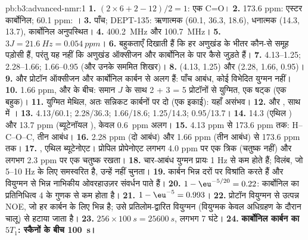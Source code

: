 \begin{solution}{pb:b3:advanced-nmr:1}
\textbf{1.} $(2 \times 6 + 2 - 12)/2 = 1$: एक C=O।
\textbf{2.} 173.6 ppm: एस्टर कार्बोनिल; 60.1 ppm: ।
\textbf{3.} पाँच; DEPT-135:  ऋणात्मक (60.1, 36.3, 18.6),  धनात्मक (14.3,
13.7), कार्बोनिल अनुपस्थित।
\textbf{4.} \qty{400.2}{MHz} और \qty{100.7}{MHz}।
\textbf{5.} $3J = \qty{21.6}{Hz} = \qty{0.054}{ppm}$।
\textbf{6.} बहुकताएँ दिखाती हैं कि हर अणुखंड के भीतर कौन-से समूह पड़ोसी हैं,
परंतु यह नहीं कि अणुखंड ऑक्सीजन और कार्बोनिल के पार कैसे जुड़ते हैं।
\textbf{7.} 4.13--1.25; 2.28--1.66; 1.66--0.95 (और उनके सममित शिखर)।
\textbf{8.}  (4.13, 1.25) और  (2.28, 1.66, 0.95)।
\textbf{9.}  और  प्रोटॉन ऑक्सीजन और
कार्बोनिल कार्बन से अलग हैं: पाँच आबंध, कोई विभेदित युग्मन नहीं।
\textbf{10.} 1.66 ppm,  और  के बीच: समान $J$ के साथ 2 + 3 = 5 प्रोटॉनों से
युग्मित, एक षट्क (एक बहुक)।
\textbf{11.} युग्मित मेथिल, अतः सन्निकट कार्बनों पर दो  (एक  इकाई): यहाँ असंभव।
\textbf{12.}  और , साथ में ।
\textbf{13.} 4.13/60.1; 2.28/36.3; 1.66/18.6; 1.25/14.3; 0.95/13.7।
\textbf{14.} 14.3 (एथिल ) और 13.7 ppm (ब्यूटेनॉयल ), केवल \qty{0.6}{ppm} अलग।
\textbf{15.} 4.13 ppm से 173.6 ppm तक: H--C--O--C, तीन आबंध।
\textbf{16.} 2.28 ppm (दो आबंध) और 1.66 ppm (तीन आबंध) से 173.6 ppm तक।
\textbf{17.} , एथिल ब्यूटेनोएट। प्रोपिल प्रोपेनोएट
लगभग 4.0 ppm पर एक  त्रिक (चतुष्क नहीं) और लगभग 2.3 ppm पर एक चतुष्क रखता।
\textbf{18.} चार-आबंध युग्मन प्रायः 1 Hz से कम होते हैं;  विलंब, जो
5--10 Hz के लिए समस्वरित है, उन्हें नहीं चुनता।
\textbf{19.} कार्बन भिन्न दरों पर विश्रांति करते हैं और वियुग्मन से भिन्न नाभिकीय
ओवरहाउज़र संवर्धन पाते हैं।
\textbf{20.} $1 - \eu^{-5/20} = 0.22$: कार्बोनिल का प्रतिनिधित्व 4 के गुणक से कम होता है।
\textbf{21.} $1 - \eu^{-5} = 0.993$।
\textbf{22.} प्रोटॉन वियुग्मन से उत्पन्न NOE, जो हर कार्बन के लिए भिन्न है; उसे
प्रतिलोम-द्वारित वियुग्मन (वियुग्मक केवल अधिग्रहण के दौरान चालू) से हटाया जाता है।
\textbf{23.} $256 \times \qty{100}{s} = \qty{25600}{s}$, लगभग 7 घंटे।
\textbf{24.} \textbf{कार्बोनिल कार्बन का $5T_1$: स्कैनों के बीच \qty{100}{s}।}
\end{solution}
